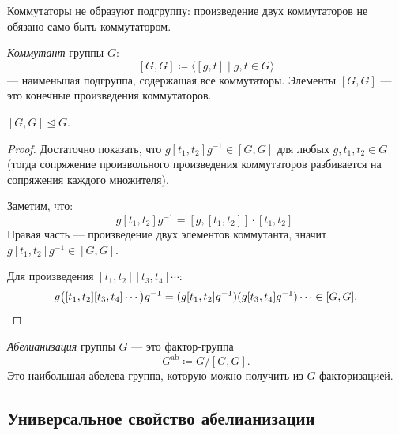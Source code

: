\begin{remark}
    Коммутаторы не образуют подгруппу: произведение двух коммутаторов не обязано само быть коммутатором.
\end{remark}

\begin{definition}
    \emph{Коммутант} группы $G$:
    \[
        [G, G] \coloneqq \langle [g, t] \mid g, t \in G \rangle
    \]
    --- наименьшая подгруппа, содержащая все коммутаторы. Элементы $[G, G]$ --- это конечные произведения коммутаторов.
\end{definition}

\begin{stmt}
    $[G, G] \trianglelefteq G$.

    \begin{proof}
        Достаточно показать, что $g [t_1, t_2] g^{-1} \in [G, G]$ для любых $g, t_1, t_2 \in G$ (тогда сопряжение произвольного произведения
        коммутаторов разбивается на сопряжения каждого множителя).

        Заметим, что:
        \[
            g [t_1, t_2] g^{-1} = [g, [t_1, t_2]] \cdot [t_1, t_2].
        \]
        Правая часть --- произведение двух элементов коммутанта, значит $g[t_1, t_2]g^{-1} \in [G,G]$.

        Для произведения $[t_1, t_2][t_3, t_4] \cdots$:
        \[
            g \bigl([t_1,t_2][t_3,t_4]\cdots\bigr) g^{-1}
            = (g[t_1,t_2]g^{-1})(g[t_3,t_4]g^{-1})\cdots \in [G, G]. \qedhere
        \]
    \end{proof}
\end{stmt}

\begin{definition}
    \emph{Абелианизация} группы $G$ --- это фактор-группа
    \[
        G^{\mathrm{ab}} \coloneqq G / [G, G].
    \]
    Это наибольшая абелева группа, которую можно получить из $G$ факторизацией.
\end{definition}

\subsection*{Универсальное свойство абелианизации}

